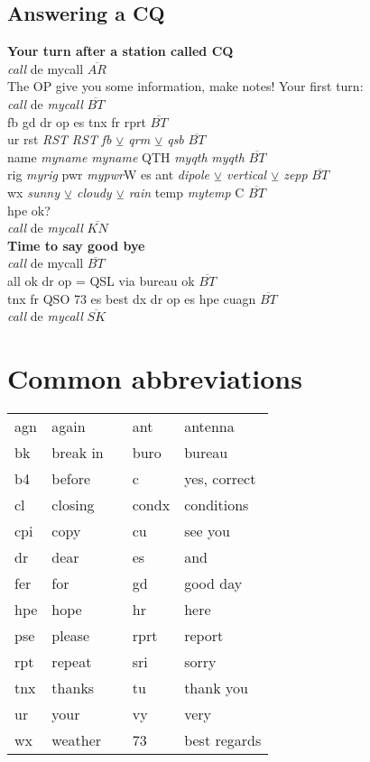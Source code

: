 \documentclass[10pt]{article}
\begin{document}
\begin{multicols}{3}
\subsection{Answering a CQ}
\vspace{\baselineskip}
\textbf{Your turn after a station called CQ}\\
\textit{call} de {mycall} $\overline{AR}$\\
The OP give you some information, make notes! 
Your first turn:\\
\textit{call} de \textit{mycall} $\overline{BT}$\\
fb gd dr op es tnx fr rprt $\overline{BT}$\\
ur rst \textit{RST} \textit{RST} \textit{fb $\veebar$ qrm $\veebar$ qsb} $\overline{BT}$\\
name \textit{myname} \textit{myname} QTH \textit{myqth} \textit{myqth} $\overline{BT}$\\
rig \textit{myrig} pwr \textit{mypwr}W es ant \textit{dipole $\veebar$ vertical $\veebar$ zepp} $\overline{BT}$\\
wx \textit{sunny $\veebar$ cloudy $\veebar$ rain} temp \textit{mytemp} C $\overline{BT}$\\
hpe ok?\\
\textit{call} de \textit{mycall} $\overline{KN}$\\
\textbf{Time to say good bye}\\
\textit{call} de {mycall} $\overline{BT}$\\
all ok dr op = QSL via bureau ok $\overline{BT}$\\
tnx fr QSO 73 es best dx dr op es hpe cuagn $\overline{BT}$\\
\textit{call} de \textit{mycall} $\overline{SK}$\\

\section{Common abbreviations}
\vspace{\baselineskip}
\begin{tabular}{lllll}
agn & again    & & ant & antenna\\
bk & break in  & & buro & bureau\\
b4 & before    & & c & yes, correct\\
cl & closing   & & condx & conditions\\
cpi & copy     & & cu & see you\\
dr & dear      & & es & and \\
fer & for      & & gd & good day\\
hpe & hope     & & hr & here\\
pse & please   & & rprt & report\\
rpt & repeat   & & sri & sorry\\
tnx & thanks   & & tu & thank you\\
ur & your      & & vy & very\\ 
wx & weather   & & 73 & best regards\\
\end{tabular}



\end{multicols}
\end{document}
